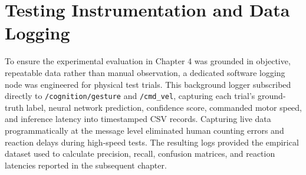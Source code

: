 \section{Testing Instrumentation and Data Logging}
\label{sec:testing_instrumentation}
To ensure the experimental evaluation in Chapter 4 was grounded in objective, repeatable data rather than manual observation, a dedicated software logging node was engineered for physical test trials. This background logger subscribed directly to \texttt{/cognition/gesture} and \texttt{/cmd\_vel}, capturing each trial's ground-truth label, neural network prediction, confidence score, commanded motor speed, and inference latency into timestamped CSV records. Capturing live data programmatically at the message level eliminated human counting errors and reaction delays during high-speed tests. The resulting logs provided the empirical dataset used to calculate precision, recall, confusion matrices, and reaction latencies reported in the subsequent chapter.
